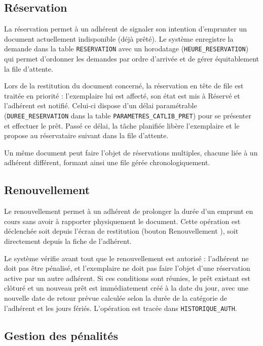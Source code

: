 \subsection{Réservation}

La réservation permet à un adhérent de signaler son intention d'emprunter un
document actuellement indisponible (déjà prêté). Le système enregistre la
demande dans la table \texttt{RESERVATION} avec un horodatage
(\texttt{HEURE\_RESERVATION}) qui permet d'ordonner les demandes par ordre
d'arrivée et de gérer équitablement la file d'attente.

Lors de la restitution du document concerné, la réservation en tête de file est
traitée en priorité : l'exemplaire lui est affecté, son état est mis à
\og Réservé \fg{} et l'adhérent est notifié. Celui-ci dispose d'un délai
paramétrable (\texttt{DUREE\_RESERVATION} dans la table
\texttt{PARAMETRES\_CATLIB\_PRET}) pour se présenter et effectuer le prêt.
Passé ce délai, la tâche planifiée libère l'exemplaire et le propose au
réservataire suivant dans la file d'attente.

Un même document peut faire l'objet de réservations multiples, chacune liée à
un adhérent différent, formant ainsi une file gérée chronologiquement.

\FloatBarrier

\subsection{Renouvellement}

Le renouvellement permet à un adhérent de prolonger la durée d'un emprunt en
cours sans avoir à rapporter physiquement le document. Cette opération est
déclenchée soit depuis l'écran de restitution (bouton \og Renouvellement \fg{}),
soit directement depuis la fiche de l'adhérent.

Le système vérifie avant tout que le renouvellement est autorisé : l'adhérent
ne doit pas être pénalisé, et l'exemplaire ne doit pas faire l'objet d'une
réservation active par un autre adhérent. Si ces conditions sont réunies, le
prêt existant est clôturé et un nouveau prêt est immédiatement créé à la date
du jour, avec une nouvelle date de retour prévue calculée selon la durée de la
catégorie de l'adhérent et les jours fériés. L'opération est tracée dans
\texttt{HISTORIQUE\_AUTH}.

\FloatBarrier

\subsection{Gestion des pénalités}

